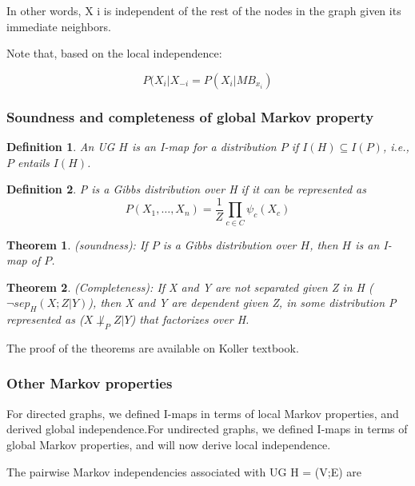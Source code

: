 \documentclass[twoside]{article}
\newtheorem{thm}{Theorem}[section]
\newtheorem{Defn}{Definition}[section]
\begin{document}
In other words, X i is independent of the rest of the nodes in the graph given its immediate neighbors.

Note that, based on the local independence:

\begin{equation}
P(X_i|X_{-i}=P(X_i|MB_{x_i})
\end{equation}

\subsubsection{Soundness and completeness of global Markov property}

\begin{Defn}
An UG \(H\) is an I-map for a distribution \(P\) if \(I(H) \subseteq I(P)\), i.e., \(P\) entails \(I(H)\).
\end{Defn}

\begin{Defn}
P is a Gibbs distribution over H if it can be represented as
\begin{equation}
P(X_1, \ldots, X_n) = \frac{1}{Z}\prod_{c\in C}\psi_c(X_c)
\end{equation}
\end{Defn}

\begin{thm}
(soundness): If \(P\) is a Gibbs distribution over \(H\), then \(H\) is an I-map of \(P\).
\end{thm}

\begin{thm}
(Completeness): If X and Y are not separated given Z in H (\(\lnot sep_H (X ; Z |Y )\)), then X and Y are dependent given Z, in some distribution P represented as (\(X \not\perp_P Z|Y \)) that factorizes over H.
\end{thm}

The proof of the theorems are available on Koller textbook.

\subsubsection{Other Markov properties}

For directed graphs, we defined I-maps in terms of local Markov properties, and derived global independence.For undirected graphs, we defined I-maps in terms of global Markov properties, and will now derive local independence.

The pairwise Markov independencies associated with UG H = (V;E) are
\end{document}

